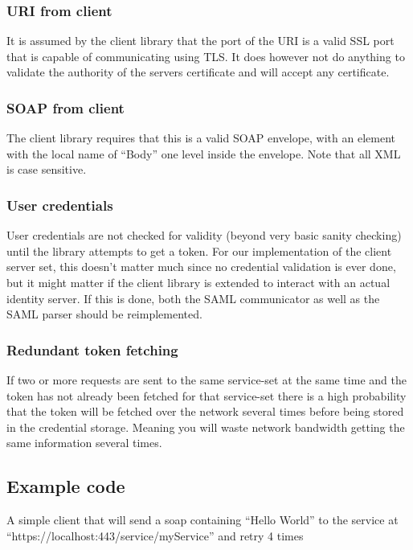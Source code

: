 \subsubsection{URI from client}
It is assumed by the client library that the port of the URI is a valid SSL port that is capable of communicating using TLS. It does however not do anything to validate the authority of the servers certificate and will accept any certificate.

\subsubsection{SOAP from client}
The client library requires that this is a valid SOAP envelope, with an element with the local name of “Body” one level inside the envelope. Note that all XML is case sensitive.

\subsubsection{User credentials}
User credentials are not checked for validity (beyond very basic sanity checking) until the library attempts to get a token.
For our implementation of the client server set, this doesn’t matter much since no credential validation is ever done, but it might matter if the client library is extended to interact with an actual identity server. If this is done, both the SAML communicator as well as the SAML parser should be reimplemented.

\subsubsection{Redundant token fetching}
If two or more requests are sent to the same service-set at the same time and the token has not already been fetched for that service-set there is a high probability that the token will be fetched over the network several times before being stored in the credential storage. Meaning you will waste network bandwidth getting the same information several times.

\subsection{Example code}\label{userguideExample}

A simple client that will send a soap containing “Hello World” to the service at “https://localhost:443/service/myService” and retry 4 times

